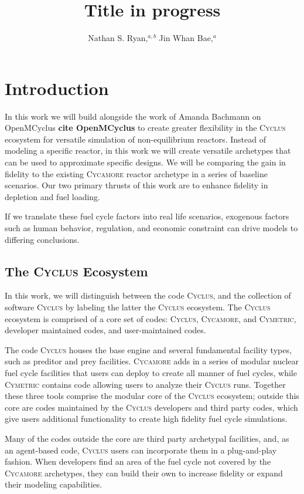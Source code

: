 \documentclass{anstrans}
\title{Title in progress}
\author{Nathan S. Ryan,$^{a, b}$ Jin Whan Bae,$^{a}$}
\institute{
$^{a}$Research and Test Reactor Physics Group, Oak Ridge National Laboratory,
Oak Ridge, TN
\and
$^{b}$Advanced Reactors and Fuel Cycles Group, University of Illinois Urbana-Champaign, Urbana, IL, nsryan2@illinois.edu
}
\newcommand{\cyclus}{\textsc{Cyclus}\xspace} %
\newcommand{\cycamore}{\textsc{Cycamore}\xspace} %
\newcommand{\cymetric}{\textsc{Cymetric}\xspace} %
\begin{document}

\section{Introduction}

In this work we will build alongside the work of Amanda Bachmann on OpenMCyclus \textbf{cite OpenMCyclus} to create greater flexibility in the \cyclus ecosystem for versatile simulation of non-equilibrium reactors. Instead of modeling a specific reactor, in this work we will create versatile archetypes that can be used to approximate specific designs. We will be comparing the gain in fidelity to the existing \cycamore reactor archetype in a series of baseline scenarios. Our two primary thrusts of this work are to enhance fidelity in depletion and fuel loading.




If we translate these fuel cycle factors into real life scenarios, exogenous factors such as human behavior, regulation, and economic constraint can drive models to differing conclusions.

\subsection{The \cyclus Ecosystem}
In this work, we will distinguish between the code \cyclus, and the collection of software \cyclus by labeling the latter the \cyclus ecosystem. The \cyclus ecosystem is comprised of a core set of codes: \cyclus, \cycamore, and \cymetric, developer maintained codes, and user-maintained codes.

The code \cyclus houses the base engine and several fundamental facility types, such as preditor and prey facilities. \cycamore adds in a series of modular nuclear fuel cycle facilities that users can deploy to create all manner of fuel cycles, while \cymetric contains code allowing users to analyze their \cyclus runs. Together these three tools comprise the modular core of the \cyclus ecosystem; outside this core are codes maintained by the \cyclus developers and third party codes, which give users additional functionality to create high fidelity fuel cycle simulations.

Many of the codes outside the core are third party archetypal facilities, and, as an agent-based code, \cyclus users can incorporate them in a plug-and-play fashion. When developers find an area of the fuel cycle not covered by the \cycamore archetypes, they can build their own to increase fidelity or expand their modeling capabilities.
\end{document}
